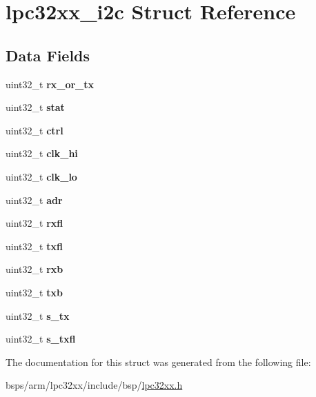 \hypertarget{structlpc32xx__i2c}{}\section{lpc32xx\+\_\+i2c Struct Reference}
\label{structlpc32xx__i2c}
\subsection*{Data Fields}
\begin{DoxyCompactItemize}
\item 
\mbox{\label{structlpc32xx__i2c_a9db7824a66d2e3b4f897a6703a42d64e}} 
uint32\+\_\+t {\bfseries rx\+\_\+or\+\_\+tx}
\item 
\mbox{\label{structlpc32xx__i2c_ac1d571edc16ac006e094f2675118e90b}} 
uint32\+\_\+t {\bfseries stat}
\item 
\mbox{\label{structlpc32xx__i2c_ae98b834180354df9f3803a9809e7536d}} 
uint32\+\_\+t {\bfseries ctrl}
\item 
\mbox{\label{structlpc32xx__i2c_ac20d1d87c5b0f9264136aea5f495caa1}} 
uint32\+\_\+t {\bfseries clk\+\_\+hi}
\item 
\mbox{\label{structlpc32xx__i2c_aa1d81056ce138c1cb4d3a2553d618871}} 
uint32\+\_\+t {\bfseries clk\+\_\+lo}
\item 
\mbox{\label{structlpc32xx__i2c_ab971635000b352c2d20e11c1ba18c368}} 
uint32\+\_\+t {\bfseries adr}
\item 
\mbox{\label{structlpc32xx__i2c_a5ceffe5f786c8eb0ea76f921c902e88b}} 
uint32\+\_\+t {\bfseries rxfl}
\item 
\mbox{\label{structlpc32xx__i2c_adb20af1cfe442881fcc1c2420491c3e6}} 
uint32\+\_\+t {\bfseries txfl}
\item 
\mbox{\label{structlpc32xx__i2c_a7bbd148d7f3e7bf382b821cbcd8aa222}} 
uint32\+\_\+t {\bfseries rxb}
\item 
\mbox{\label{structlpc32xx__i2c_a7db722aca849b8b75749c888f757bd52}} 
uint32\+\_\+t {\bfseries txb}
\item 
\mbox{\label{structlpc32xx__i2c_a2ae480732f640bb6b071545d58b8e237}} 
uint32\+\_\+t {\bfseries s\+\_\+tx}
\item 
\mbox{\label{structlpc32xx__i2c_ac67a250c0dcccfa98c535570129ece74}} 
uint32\+\_\+t {\bfseries s\+\_\+txfl}
\end{DoxyCompactItemize}


The documentation for this struct was generated from the following file\+:\begin{DoxyCompactItemize}
\item 
bsps/arm/lpc32xx/include/bsp/\mbox{\hyperlink{lpc32xx_8h}{lpc32xx.\+h}}\end{DoxyCompactItemize}
